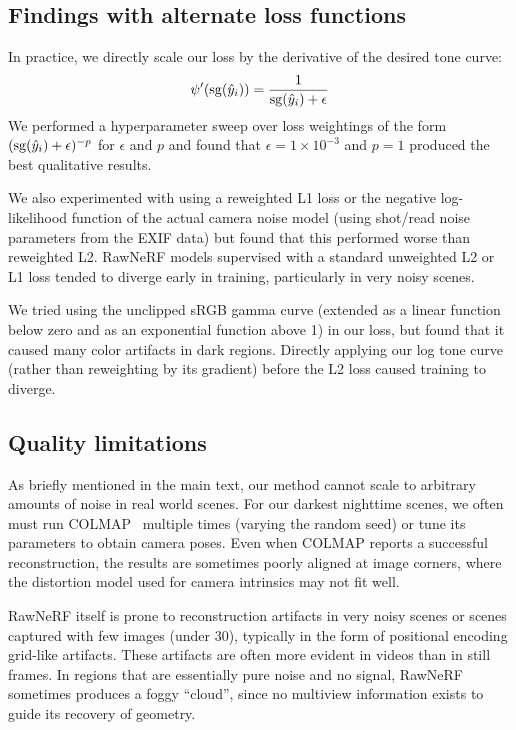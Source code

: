 \subsection{Findings with alternate loss functions}

In practice, we directly scale our loss by the derivative of the desired tone curve:
\begin{equation}
   \psi'(\mathrm{sg}(\hat y_i)) = \frac{1}{\mathrm{sg}(\hat y_i) + \epsilon}
\end{equation}
We performed a hyperparameter sweep over loss weightings of the form $(\mathrm{sg}(\hat y_i) + \epsilon)^{-p}$ for $\epsilon$ and $p$ and found that $\epsilon=1\times 10^{-3}$ and $p=1$ produced the best qualitative results. 

We also experimented with using a reweighted L1 loss or the negative log-likelihood function of the actual camera noise model (using shot/read noise parameters from the EXIF data) but found that this performed worse than reweighted L2. RawNeRF models supervised with a standard unweighted L2 or L1 loss tended to diverge early in training, particularly in very noisy scenes.

We tried using the unclipped sRGB gamma curve (extended as a linear function below zero and as an exponential function above 1) in our loss, but found that it caused many color artifacts in dark regions. Directly applying our log tone curve (rather than reweighting by its gradient) before the L2 loss caused training to diverge.


\subsection{Quality limitations}

As briefly mentioned in the main text, our method cannot scale to arbitrary amounts of noise in real world scenes. For our darkest nighttime scenes, we often must run COLMAP~\cite{colmap} multiple times (varying the random seed) or tune its parameters to obtain camera poses. Even when COLMAP reports a successful reconstruction, the results are sometimes poorly aligned at image corners, where the distortion model used for camera intrinsics may not fit well. 

RawNeRF itself is prone to reconstruction artifacts in very noisy scenes or scenes captured with few images (under 30), typically in the form of positional encoding grid-like artifacts. These artifacts are often more evident in videos than in still frames. In regions that are essentially pure noise and no signal, RawNeRF sometimes produces a foggy ``cloud'', since no multiview information exists to guide its recovery of geometry.

